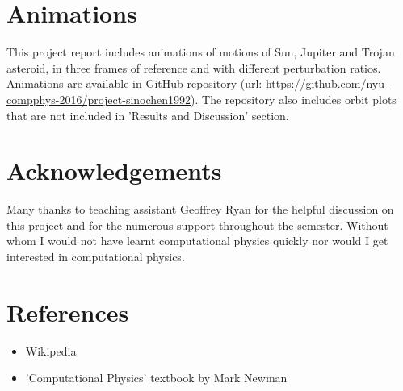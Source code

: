 \documentclass[12pt,a4paper]{article}
\begin{document}
\section{Animations}
This project report includes animations of motions of Sun, Jupiter and Trojan asteroid, in three frames of reference and with different perturbation ratios. Animations are available in GitHub repository (url: \url{https://github.com/nyu-compphys-2016/project-sinochen1992}).  The repository also includes orbit plots that are not included in 'Results and Discussion' section.

\section{Acknowledgements}
Many thanks to teaching assistant Geoffrey Ryan for the helpful discussion on this project and for the numerous support throughout the semester. Without whom I would not have learnt computational physics quickly nor would I get interested in computational physics.

\section{References}
\begin{itemize}
\item Wikipedia
\item 'Computational Physics' textbook by Mark Newman 
\end{itemize}
\end{document}
